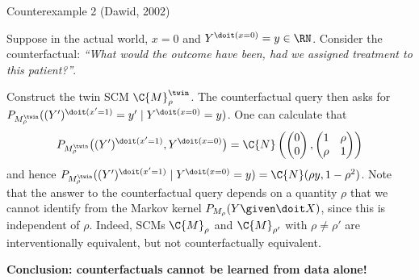 \begin{frame}{Counterexample 2 (Dawid, 2002)}
\begin{example}[2/2]
  Suppose in the actual world, $x = 0$ and $Y^{\doit(x=0)} = y \in \RN$.
  Consider the counterfactual: {\it ``What would the outcome have been, had we assigned treatment to this patient?''}.

  Construct the twin SCM $\C{M}_{\rho}^{\twin}$.
  The counterfactual query then asks for $P_{M_{\rho}^\twin}((Y')^{\doit(x'=1)}=y'\mid Y^{\doit(x=0)}=y)$. One can calculate that
$$
  P_{M_{\rho}^\twin}\big((Y')^{\doit(x'=1)},Y^{\doit(x=0)}\big) = \C{N}\left(\begin{pmatrix}0\\ 0\end{pmatrix}, \begin{pmatrix} 1 & \rho \\ \rho & 1 \end{pmatrix}\right)
$$
  and hence $P_{M_{\rho}^\twin}((Y')^{\doit(x'=1)} \mid Y^{\doit(x=0)}=y) = \C{N}(\rho y,1-\rho^2)$. Note that the answer to the counterfactual query depends on a quantity $\rho$ that we cannot identify from the Markov kernel $P_{M_{\rho}}(Y\given \doit X)$, since this is independent of $\rho$. 
Indeed, SCMs $\C{M}_{\rho}$ and $\C{M}_{\rho'}$ with $\rho\neq\rho'$ are interventionally equivalent, but not counterfactually equivalent.
\end{example}
  \textbf{Conclusion: counterfactuals cannot be learned from data alone!}
\end{frame}
